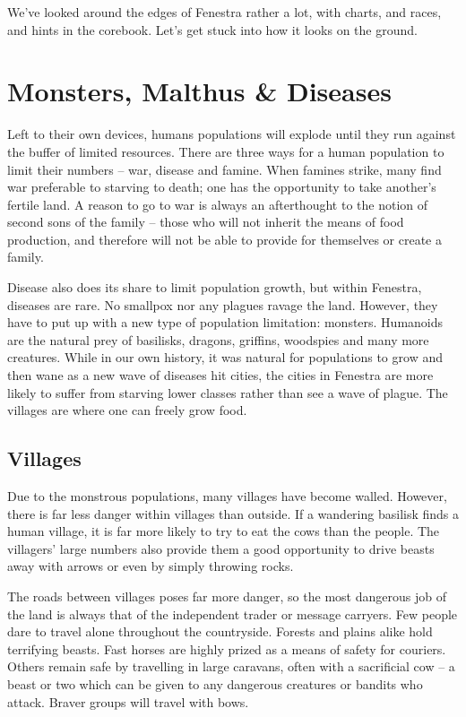 We've looked around the edges of Fenestra rather a lot, with charts, and races, and hints in the corebook.  Let's get stuck into how it looks on the ground.

\section{Monsters, Malthus \& Diseases}

Left to their own devices, humans populations will explode until they run against the buffer of limited resources.  There are three ways for a human population to limit their numbers -- war, disease and famine.  When famines strike, many find war preferable to starving to death; one has the opportunity to take another's fertile land.  A reason to go to war is always an afterthought to the notion of second sons of the family -- those who will not inherit the means of food production, and therefore will not be able to provide for themselves or create a family.

Disease also does its share to limit population growth, but within Fenestra, diseases are rare.  No smallpox nor any plagues ravage the land.  However, they have to put up with a new type of population limitation: monsters.  Humanoids are the natural prey of basilisks, dragons, griffins, woodspies and many more creatures.  While in our own history, it was natural for populations to grow and then wane as a new wave of diseases hit cities, the cities in Fenestra are more likely to suffer from starving lower classes rather than see a wave of plague.  The villages are where one can freely grow food.

\subsection{Villages}

Due to the monstrous populations, many villages have become walled.  However, there is far less danger within villages than outside.  If a wandering basilisk finds a human village, it is far more likely to try to eat the cows than the people.  The villagers' large numbers also provide them a good opportunity to drive beasts away with arrows or even by simply throwing rocks.

The roads between villages poses far more danger, so the most dangerous job of the land is always that of the independent trader or message carryers.  Few people dare to travel alone throughout the countryside.
Forests and plains alike hold terrifying beasts.  Fast horses are highly prized as a means of safety for couriers.  Others remain safe by travelling in large caravans, often with a sacrificial cow -- a beast or two which can be given to any dangerous creatures or bandits who attack.  Braver groups will travel with bows.

